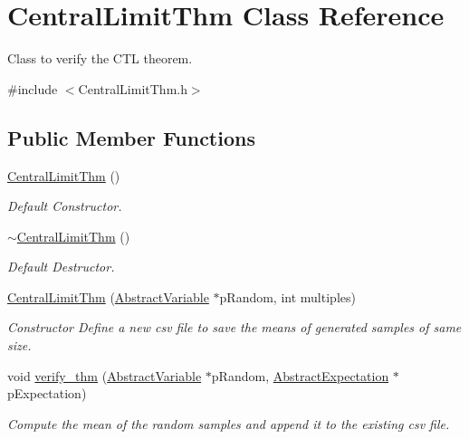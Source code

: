\hypertarget{classCentralLimitThm}{}\section{Central\+Limit\+Thm Class Reference}
\label{classCentralLimitThm}


Class to verify the C\+TL theorem.  




{\ttfamily \#include $<$Central\+Limit\+Thm.\+h$>$}

\subsection*{Public Member Functions}
\begin{DoxyCompactItemize}
\item 
\mbox{\label{classCentralLimitThm_a70d886fa3a13dd2e3dbe7bc6c996fb2f}} 
\hyperlink{classCentralLimitThm_a70d886fa3a13dd2e3dbe7bc6c996fb2f}{Central\+Limit\+Thm} ()
\begin{DoxyCompactList}\small\item\em Default Constructor. \end{DoxyCompactList}\item 
\mbox{\label{classCentralLimitThm_acd4def2fc5647a486a5c766a7f8a61b2}} 
\hyperlink{classCentralLimitThm_acd4def2fc5647a486a5c766a7f8a61b2}{$\sim$\+Central\+Limit\+Thm} ()
\begin{DoxyCompactList}\small\item\em Default Destructor. \end{DoxyCompactList}\item 
\hyperlink{classCentralLimitThm_a41cc29d0165ac8738d926593a43fd586}{Central\+Limit\+Thm} (\hyperlink{classAbstractVariable}{Abstract\+Variable} $\ast$p\+Random, int multiples)
\begin{DoxyCompactList}\small\item\em Constructor Define a new csv file to save the means of generated samples of same size. \end{DoxyCompactList}\item 
void \hyperlink{classCentralLimitThm_a3898fbea7b16e86a2632914abbe67704}{verify\+\_\+thm} (\hyperlink{classAbstractVariable}{Abstract\+Variable} $\ast$p\+Random, \hyperlink{classAbstractExpectation}{Abstract\+Expectation} $\ast$p\+Expectation)
\begin{DoxyCompactList}\small\item\em Compute the mean of the random samples and append it to the existing csv file. \end{DoxyCompactList}\end{DoxyCompactItemize}



